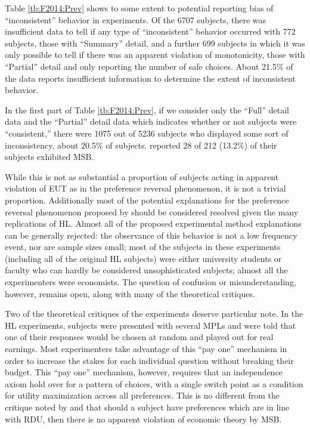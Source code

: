 \documentclass[../main.tex]{subfiles}
\begin{document}
Table \ref{tb:F2014:Prev} shows to some extent to potential reporting bias of \enquote{inconsistent} behavior in experiments.
Of the 6707 subjects, there was insufficient data to tell if any type of \enquote{inconsistent} behavior occurred with 772 subjects, those with \enquote{Summary} detail, and a further 699 subjects in which it was only possible to tell if there was an apparent violation of monotonicity, those with \enquote{Partial} detail and only reporting the number of safe choices.
About 21.5\% of the data reports insufficient information to determine the extent of inconsistent behavior.

In the first part of Table \ref{tb:F2014:Prev}, if we consider only the \enquote{Full} detail data and the \enquote{Partial} detail data which indicates whether or not subjects were \enquote{consistent,} there were 1075 out of 5236 subjects who displayed some sort of inconsistency, about 20.5\% of subjects.
\textcite[1647]{Holt2002} reported 28 of 212 (13.2\%) of their subjects exhibited MSB.

While this is not as substantial a proportion of subjects acting in apparent violation of EUT as in the \textcite{Grether1979} preference reversal phenomenon, it is not a trivial proportion.
Additionally most of the potential explanations for the preference reversal phenomenon proposed by \textcite{Grether1979} should be considered resolved given the many replications of HL.
Almost all of the proposed experimental method explanations can be generally rejected: the observance of this behavior is not a low frequency event, nor are sample sizes small; most of the subjects in these experiments (including all of the original HL subjects) were either university students or faculty who can hardly be considered unsophisticated subjects; almost all the experimenters were economists.
The question of confusion or misunderstanding, however, remains open, along with many of the theoretical critiques.

Two of the theoretical critiques of the \textcite{Grether1979} experiments deserve particular note.
In the HL experiments, subjects were presented with several MPLs and were told that one of their responses would be chosen at random and played out for real earnings.
Most experimenters take advantage of this \enquote{pay one} mechanism in order to increase the stakes for each individual question without breaking their budget.
This \enquote{pay one} mechanism, however, requires that an independence axiom hold over for a pattern of choices, with a single switch point as a condition for utility maximization across all preferences.
This is no different from the critique noted by \textcite{Holt1986} and \textcite{Karni1987} that should a subject have preferences which are in line with RDU, then there is no apparent violation of economic theory by MSB.
\end{document}
